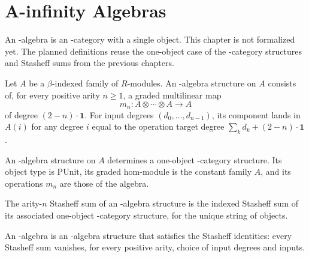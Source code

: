 
\chapter{A-infinity Algebras}

An \Ainf{}-algebra is an \Ainf{}-category with a single object. This chapter is not
formalized yet. The planned definitions reuse the one-object case of the \Ainf{}-category
structures and Stasheff sums from the previous chapters.

\begin{definition}
\label{AInfinityTheory.AInfinityAlgebraStruct}
Let $A$ be a $\beta$-indexed family of $R$-modules. An \Ainf{}-algebra structure on $A$
consists of, for every positive arity $n \geq 1$, a graded multilinear map
\[
  m_n : A \otimes \cdots \otimes A \to A
\]
of degree $(2-n) \cdot \mathbf{1}$. For input degrees $(d_0,\dots,d_{n-1})$, its
component lands in $A(i)$ for any degree $i$ equal to the operation target degree
$\sum_k d_k + (2-n) \cdot \mathbf{1}$.
\end{definition}

\begin{definition}[Associated \Ainf{}-category structure]
\label{AInfinityTheory.AInfinityAlgebraStruct.toAInfinityCategoryStruct}
An \Ainf{}-algebra structure on $A$ determines a one-object \Ainf{}-category structure. Its
object type is $\mathrm{PUnit}$, its graded hom-module is the constant family $A$, and its
operations $m_n$ are those of the algebra.
\end{definition}

\begin{definition}
\label{AInfinityTheory.AInfinityAlgebraStruct.stasheffSum}
The arity-$n$ Stasheff sum of an \Ainf{}-algebra structure is the indexed Stasheff sum of
its associated one-object \Ainf{}-category structure, for the unique string of objects.
\end{definition}

\begin{definition}
\label{AInfinityTheory.AInfinityAlgebra}
An \Ainf{}-algebra is an \Ainf{}-algebra structure that satisfies the Stasheff
identities: every Stasheff sum vanishes, for every positive arity, choice of input degrees
and inputs.
\end{definition}

